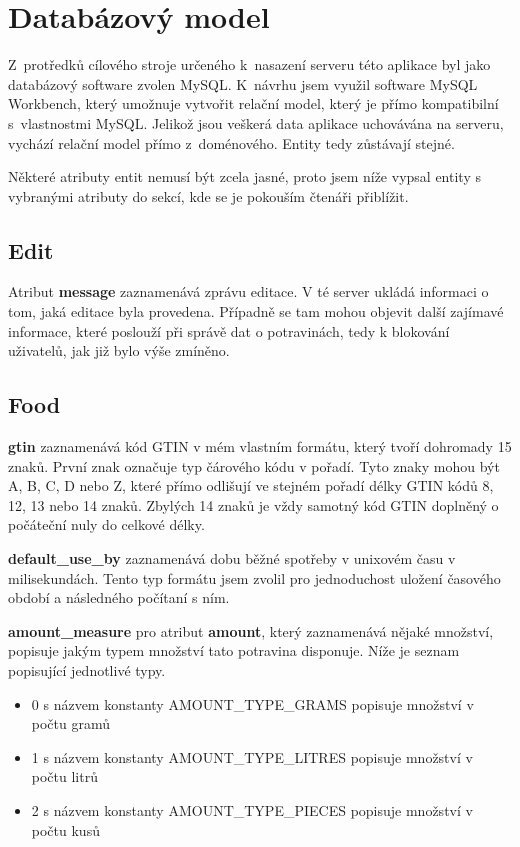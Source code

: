 \documentclass[thesis=B,czech]{FITthesis}[2013/10/20]
\begin{document}
\section{Databázový model}

Z~protředků cílového stroje určeného k~nasazení serveru této aplikace byl jako databázový software zvolen MySQL. K~návrhu jsem využil software MySQL Workbench, který umožnuje vytvořit relační model, který je přímo kompatibilní s~vlastnostmi MySQL. Jelikož jsou veškerá data aplikace uchovávána na serveru, vychází relační model přímo z~doménového. Entity tedy zůstávají stejné.

Některé atributy entit nemusí být zcela jasné, proto jsem níže vypsal entity s vybranými atributy do sekcí, kde se je pokouším čtenáři přiblížit.

\subsection{Edit}

Atribut \textbf{message} zaznamenává zprávu editace. V té server ukládá informaci o tom, jaká editace byla provedena. Případně se tam mohou objevit další zajímavé informace, které poslouží při správě dat o potravinách, tedy k blokování uživatelů, jak již bylo výše zmíněno.

\subsection{Food}

\textbf{gtin} zaznamenává kód GTIN v mém vlastním formátu, který tvoří dohromady 15 znaků. První znak označuje typ čárového kódu v pořadí. Tyto znaky mohou být A, B, C, D nebo Z, které přímo odlišují ve stejném pořadí délky GTIN kódů 8, 12, 13 nebo 14 znaků. Zbylých 14 znaků je vždy samotný kód GTIN doplněný o počáteční nuly do celkové délky.

\textbf{default\_use\_by} zaznamenává dobu běžné spotřeby v unixovém času v milisekundách. Tento typ formátu jsem zvolil pro jednoduchost uložení časového období a následného počítaní s ním.

\textbf{amount\_measure} pro atribut \textbf{amount}, který zaznamenává nějaké množství, popisuje jakým typem množství tato potravina disponuje. Níže je seznam popisující jednotlivé typy.

\begin{itemize}
  \item 0 s názvem konstanty AMOUNT\_TYPE\_GRAMS popisuje množství v počtu gramů
  \item 1 s názvem konstanty AMOUNT\_TYPE\_LITRES popisuje množství v počtu litrů
  \item 2 s názvem konstanty AMOUNT\_TYPE\_PIECES popisuje množství v počtu kusů
\end{itemize}
\end{document}
